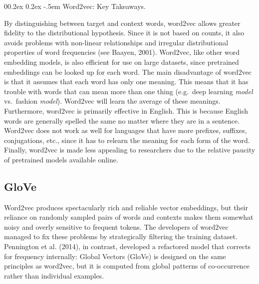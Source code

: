 \documentclass[
  man,
  floatsintext,
  longtable,
  nolmodern,
  notxfonts,
  notimes,
  colorlinks=true,linkcolor=blue,citecolor=blue,urlcolor=blue]{apa7}
\makeatletter
\renewcommand{\paragraph}{\@startsection{paragraph}{4}{\parindent}%
	{0\baselineskip \@plus 0.2ex \@minus 0.2ex}%
	{-.5em}%
	{\normalfont\normalsize\bfseries\typesectitle}}
\makeatother
\begin{document}
\paragraph{Word2vec: Key Takeaways.}\label{word2vec-key-takeaways}

By distinguishing between target and context words, word2vec allows
greater fidelity to the distributional hypothesis. Since it is not based
on counts, it also avoids problems with non-linear relationships and
irregular distributional properties of word frequencies (see Baayen,
2001). Word2vec, like other word embedding models, is also efficient for
use on large datasets, since pretrained embeddings can be looked up for
each word. The main disadvantage of word2vec is that it assumes that
each word has only one meaning. This means that it has trouble with
words that can mean more than one thing (e.g.~deep learning \emph{model}
vs.~fashion \emph{model}). Word2vec will learn the average of these
meanings. Furthermore, word2vec is primarily effective in English. This
is because English words are generally spelled the same no matter where
they are in a sentence. Word2vec does not work as well for languages
that have more prefixes, suffixes, conjugations, etc., since it has to
relearn the meaning for each form of the word. Finally, word2vec is made
less appealing to researchers due to the relative paucity of pretrained
models available online.

\subsection{GloVe}\label{glove}

Word2vec produces spectacularly rich and reliable vector embeddings, but
their reliance on randomly sampled pairs of words and contexts makes
them somewhat noisy and overly sensitive to frequent tokens. The
developers of word2vec managed to fix these problems by strategically
filtering the training dataset. Pennington et al. (2014), in contrast,
developed a refactored model that corrects for frequency internally:
Global Vectors (GloVe) is designed on the same principles as word2vec,
but it is computed from global patterns of co-occurrence rather than
individual examples.
\end{document}

